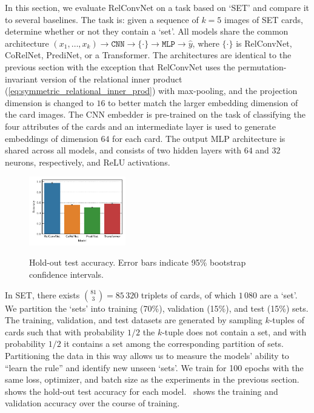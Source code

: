 In this section, we evaluate RelConvNet on a task based on `SET' and compare it to several baselines. The task is: given a sequence of $k=5$ images of SET cards, determine whether or not they contain a `set'. All models share the common architecture $(x_1, \ldots, x_k) \to \texttt{CNN} \to \{ \cdot \} \to \texttt{MLP} \to \hat{y}$, where $\{\cdot\}$ is RelConvNet, CoRelNet, PrediNet, or a Transformer. The architectures are identical to the previous section with the exception that RelConvNet uses the permutation-invariant version of the relational inner product (\cref{eq:symmetric_relational_inner_prod}) with max-pooling, and the projection dimension is changed to $16$ to better match the larger embedding dimension of the card images. The CNN embedder is pre-trained on the task of classifying the four attributes of the cards and an intermediate layer is used to generate embeddings of dimension $64$ for each card. The output MLP architecture is shared across all models, and consists of two hidden layers with $64$ and $32$ neurons, respectively, and ReLU activations.

\begin{figure}
    \centering
    \vskip-10pt
    \includegraphics[width=0.375\textwidth]{figs/experiments/contains_set_acc.pdf}\\[-5pt]
    \caption{\footnotesize{Hold-out test accuracy. Error bars indicate 95\% bootstrap confidence intervals.}}\label{fig:contains_set_acc}
\end{figure}

In SET, there exists $\binom{81}{3} = 85\,320$ triplets of cards, of which $1\,080$ are a `set'. We partition the `sets' into training (70\%), validation (15\%), and test (15\%) sets. The training, validation, and test datasets are generated by sampling $k$-tuples of cards such that with probability $1/2$ the $k$-tuple does not contain a set, and with probability $1/2$ it contains a set among the corresponding partition of sets. Partitioning the data in this way allows us to measure the models' ability to ``learn the rule'' and identify new unseen `sets'. We train for 100 epochs with the same loss, optimizer, and batch size as the experiments in the previous section.~ shows the hold-out test accuracy for each model.~ shows the training and validation accuracy over the course of training.

